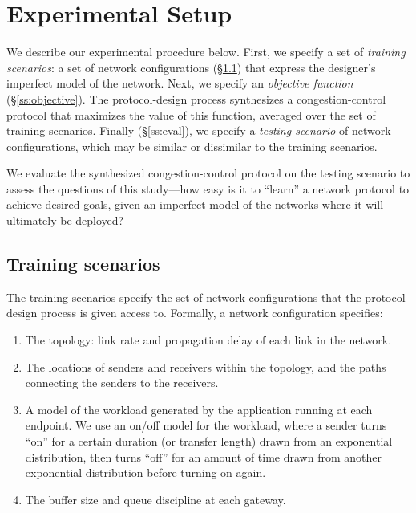 \section{Experimental Setup}

\label{s:experiment}
We describe our experimental procedure below.  First, we specify a set
of \textit{training scenarios}: a set of network configurations
(\S\ref{ss:nwkcfg}) that express the designer's imperfect model of the
network. Next, we specify an \textit{objective function}
(\S\ref{ss:objective}). The protocol-design process synthesizes a
congestion-control protocol that maximizes the value of this function,
averaged over the set of training scenarios. Finally
(\S\ref{ss:eval}), we specify a \textit{testing scenario} of network
configurations, which may be similar or dissimilar to the training
scenarios.

We evaluate the synthesized congestion-control protocol on the testing
scenario to assess the questions of this study---how easy is it to
``learn'' a network protocol to achieve desired goals, given an imperfect
model of the networks where it will ultimately be deployed?


\subsection{Training scenarios}
\label{ss:nwkcfg}
The training scenarios specify the set of network configurations that
the protocol-design process is given access to. Formally, a network
configuration specifies:

\begin{enumerate}
\item The topology: link rate and propagation delay of each link in the network.
\item The locations of senders and receivers within the topology, and the paths
      connecting the senders to the receivers.
\item A model of the workload generated by the application running
  at each endpoint. We use an on/off model for the workload, where a
  sender turns ``on'' for a certain duration (or transfer length) drawn
  from an exponential distribution, then turns ``off'' for an amount of
  time drawn from another exponential distribution before turning on
  again.
\item The buffer size and queue discipline at each gateway.
\end{enumerate}


